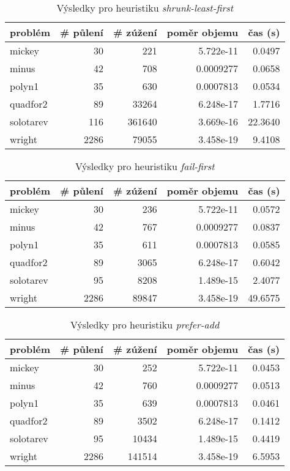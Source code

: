 {\begin{table}[H]
\centering
\begin{tabular}{lrrrr}
\hline
problém & \# půlení & \# zúžení & poměr objemu & čas (s) \\ \hline
mickey & 30 & 221 & 5.722e-11 & 0.0497 \\
minus & 42 & 708 & 0.0009277 & 0.0658 \\
polyn1 & 35 & 630 & 0.0007813 & 0.0534 \\
quadfor2 & 89 & 33264 & 6.248e-17 & 1.7716 \\
solotarev & 116 & 361640 & 3.669e-16 & 22.3640 \\
wright & 2286 & 79055 & 3.458e-19 & 9.4108 \\
\end{tabular}
\caption{Výsledky pro heuristiku \emph{shrunk-least-first}}
\label{shrunk-least-first}
\end{table}



\begin{table}[H]
\centering
\begin{tabular}{lrrrr}
\hline
problém & \# půlení & \# zúžení & poměr objemu & čas (s) \\ \hline
mickey & 30 & 236 & 5.722e-11 & 0.0572 \\
minus & 42 & 767 & 0.0009277 & 0.0837 \\
polyn1 & 35 & 611 & 0.0007813 & 0.0585 \\
quadfor2 & 89 & 3065 & 6.248e-17 & 0.6042 \\
solotarev & 95 & 8208 & 1.489e-15 & 2.4077 \\
wright & 2286 & 89847 & 3.458e-19 & 49.6575 \\
\end{tabular}
\caption{Výsledky pro heuristiku \emph{fail-first}}
\label{fail-first}
\end{table}



\begin{table}[H]
\centering
\begin{tabular}{lrrrr}
\hline
problém & \# půlení & \# zúžení & poměr objemu & čas (s) \\ \hline
mickey & 30 & 252 & 5.722e-11 & 0.0453 \\
minus & 42 & 760 & 0.0009277 & 0.0513 \\
polyn1 & 35 & 639 & 0.0007813 & 0.0461 \\
quadfor2 & 89 & 3502 & 6.248e-17 & 0.1412 \\
solotarev & 95 & 10434 & 1.489e-15 & 0.4419 \\
wright & 2286 & 141514 & 3.458e-19 & 6.5953 \\
\end{tabular}
\caption{Výsledky pro heuristiku \emph{prefer-add}}
\label{prefer-add}
\end{table}



}
